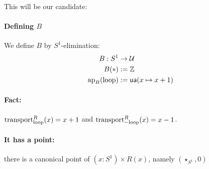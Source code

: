 \documentclass[10pt,oneside,leqno,openright]{memoir}
\begin{document}
This will be our candidate:
\paragraph{Defining $B$}
We define $B$ by $S^1$-elimination:
\begin{align*}
    B : S^1 &\to \mathcal{U} \\
    B(\ast) &:= \mathbb{Z} \\
    \operatorname{ap}_B(\mathrm{loop}) &:= \mathsf{ua}(x \mapsto x + 1)
\end{align*}
\paragraph{Fact:} $\operatorname{transport}^R_{\mathrm{loop}}(x) = x + 1$ and  $\operatorname{transport}^R_{-\mathrm{loop}}(x) = x - 1$.
\paragraph{It has a point:} there is a canonical point of $(x : S^1) \times R(x)$, namely $(\star_{S^1}, 0)$\\
\end{document}
